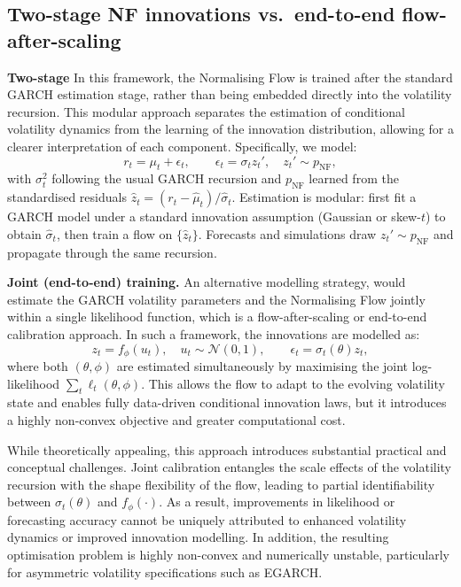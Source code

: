 \documentclass[risks,article,submit,pdftex,moreauthors]{Definitions/mdpi}
\begin{document}
\subsection{Two-stage NF innovations vs.\ end-to-end flow-after-scaling}
\label{sec:nf-contrast}
\textbf{Two-stage} In this framework, the Normalising Flow is trained after the standard GARCH estimation stage, rather than being embedded directly into the volatility recursion. This modular approach separates the estimation of conditional volatility dynamics from the learning of the innovation distribution, allowing for a clearer interpretation of each component. Specifically, we model:
\[
r_t=\mu_t+\epsilon_t,\qquad \epsilon_t=\sigma_t z_t', \quad z_t' \sim p_{\text{NF}},
\]
with $\sigma_t^2$ following the usual GARCH recursion and $p_{\text{NF}}$ learned from the standardised residuals $\hat z_t=(r_t-\hat\mu_t)/\hat\sigma_t$. Estimation is modular: first fit a GARCH model under a standard innovation assumption (Gaussian or skew-$t$) to obtain 
$\hat\sigma_t$, then train a flow on $\{\hat z_t\}$. 
Forecasts and simulations draw $z_t' \sim p_{\text{NF}}$ 
and propagate through the same recursion.

\textbf{Joint (end-to-end) training.} 
An alternative modelling strategy, would estimate the GARCH volatility parameters and the Normalising Flow jointly within a single likelihood function, which is a flow-after-scaling or end-to-end calibration approach. In such a framework, the innovations are modelled as:
\[
z_t = f_\phi(u_t), \quad u_t \sim \mathcal{N}(0,1), \qquad 
\epsilon_t = \sigma_t(\theta) z_t,
\]
where both $(\theta, \phi)$ are estimated simultaneously by maximising 
the joint log-likelihood 
$\sum_t \ell_t(\theta, \phi)$. 
This allows the flow to adapt to the evolving volatility state 
and enables fully data-driven conditional innovation laws,  but it introduces a highly non-convex objective and greater computational cost.

While theoretically appealing, this approach introduces substantial practical and conceptual challenges. Joint calibration entangles the scale effects of the volatility recursion with the shape flexibility of the flow, leading to partial identifiability between $\sigma_t(\theta)$ and $f_\phi(\cdot)$. As a result, improvements in likelihood or forecasting accuracy cannot be uniquely attributed to enhanced volatility dynamics or improved innovation modelling. In addition, the resulting optimisation problem is highly non-convex and numerically unstable, particularly for asymmetric volatility specifications such as EGARCH.
\end{document}
